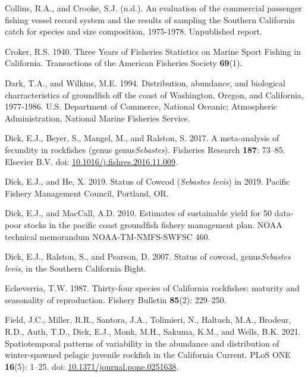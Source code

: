 \documentclass[
  english,
  a4paper,
]{article}
\newlength{\cslhangindent}
\newlength{\cslentryspacingunit} %
\newenvironment{CSLReferences}[2] %
 {%
  \setlength{\parindent}{0pt}
  \ifodd #1
  \let\oldpar\par
  \def\par{\hangindent=\cslhangindent\oldpar}
  \fi
  \setlength{\parskip}{#2\cslentryspacingunit}
 }%
 {}
\begin{document}
\begin{CSLReferences}{1}{0}
\leavevmode{}%
Collins, R.A., and Crooke, S.J. (n.d.). {An evaluation of the commercial passenger fishing vessel record system and the results of sampling the Southern California catch for species and size composition, 1975-1978}. Unpublished report.

\leavevmode{}%
Croker, R.S. 1940. {Three Years of Fisheries Statistics on Marine Sport Fishing in California}. Transactions of the American Fisheries Society \textbf{69}(1).

\leavevmode{}%
Dark, T.A., and Wilkins, M.E. 1994. {Distribution, abundance, and biological charracteristics of groundfish off the coast of Washington, Oregon, and California, 1977-1986}. U.S. Department of Commerce, National Oceanic; Atmospheric Administration, National Marine Fisheries Service.

\leavevmode{}%
Dick, E.J., Beyer, S., Mangel, M., and Ralston, S. 2017. {A meta-analysis of fecundity in rockfishes (genus genus\emph{Sebastes})}. Fisheries Research \textbf{187}: 73--85. Elsevier B.V. doi: \href{https://doi.org/10.1016/j.fishres.2016.11.009}{10.1016/j.fishres.2016.11.009}.

\leavevmode{}%
Dick, E.J., and He, X. 2019. {Status of Cowcod (\emph{Sebastes levis}) in 2019}. Pacific Fishery Management Council, Portland, OR.

\leavevmode{}%
Dick, E.J., and MacCall, A.D. 2010. {Estimates of sustainable yield for 50 data-poor stocks in the pacific coast groundfish fishery management plan}. NOAA technical memorandum NOAA-TM-NMFS-SWFSC 460.

\leavevmode{}%
Dick, E.J., Ralston, S., and Pearson, D. 2007. {Status of cowcod, genus\emph{Sebastes levis}, in the Southern California Bight}.

\leavevmode{}%
Echeverria, T.W. 1987. {Thirty-four species of California rockfishes: maturity and seasonality of reproduction}. Fishery Bulletin \textbf{85}(2): 229--250.

\leavevmode{}%
Field, J.C., Miller, R.R., Santora, J.A., Tolimieri, N., Haltuch, M.A., Brodeur, R.D., Auth, T.D., Dick, E.J., Monk, M.H., Sakuma, K.M., and Wells, B.K. 2021. {Spatiotemporal patterns of variability in the abundance and distribution of winter-spawned pelagic juvenile rockfish in the California Current}. PLoS ONE \textbf{16}(5): 1--25. doi: \href{https://doi.org/10.1371/journal.pone.0251638}{10.1371/journal.pone.0251638}.


\end{CSLReferences}
\end{document}
